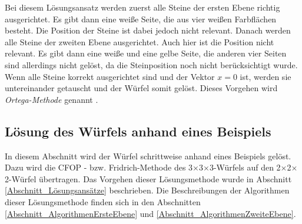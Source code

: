 \documentclass[12pt,a4paper, usenames, dvipsnames]{article}
\theoremstyle{mystyle}
\theoremstyle{definition}
\newcommand{\Ttwo}{2$\times$2$\times$2-}
\newcommand{\Tthree}{3$\times$3$\times$3-}
\begin{document}
Bei diesem Lösungsansatz werden zuerst alle Steine der ersten Ebene richtig ausgerichtet. Es gibt dann eine weiße Seite, die aus vier weißen Farbflächen besteht. Die Position der Steine ist dabei jedoch nicht relevant. Danach werden alle Steine der zweiten Ebene ausgerichtet. Auch hier ist die Position nicht relevant. Es gibt dann eine weiße und eine gelbe Seite, die anderen vier Seiten sind allerdings nicht gelöst, da die Steinposition noch nicht berücksichtigt wurde.
Wenn alle Steine korrekt ausgerichtet sind und der Vektor $x=0$ ist, werden sie untereinander getauscht und der Würfel somit gelöst. Dieses Vorgehen wird \textit{Ortega-Methode} genannt \cite{RF2}.





%
%
%
%
%
%
%
%
%
%
%
%
%
%
%
%
%
%
%
%
\subsection{Lösung des Würfels anhand eines Beispiels}

\label{Abschnitt_LösungBeispiel}


In diesem Abschnitt wird der Würfel schrittweise anhand eines Beispiels gelöst. Dazu wird die CFOP - bzw. Fridrich-Methode des \Tthree Würfels auf den \Ttwo Würfel übertragen. Das Vorgehen dieser Lösungsmethode wurde in Abschnitt \ref{Abschnitt_Lösungsansätze} beschrieben. Die Beschreibungen der Algorithmen dieser Lösungsmethode finden sich in den Abschnitten \ref{Abschnitt_AlgorithmenErsteEbene} und \ref{Abschnitt_AlgorithmenZweiteEbene}.
\end{document}
